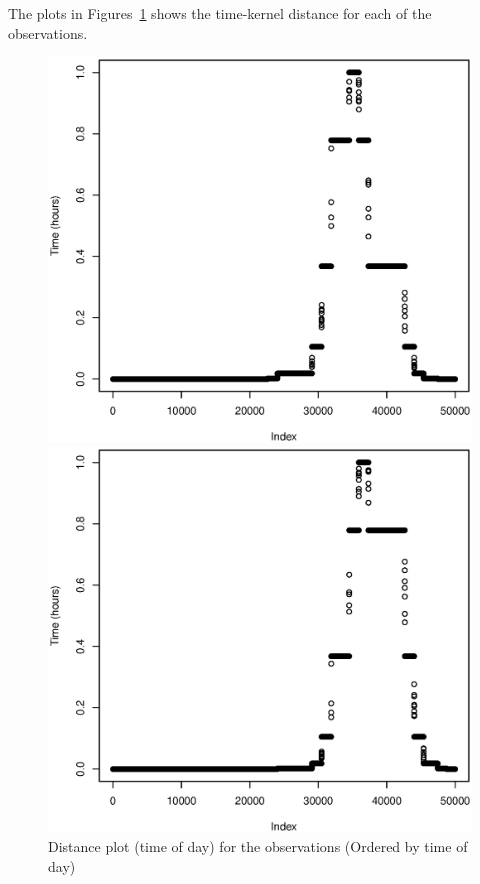 \documentclass[a4paper, twocolumn]{article}
\begin{document}
    The plots in Figures~\ref{fig:time} shows the time-kernel distance for each of the observations.  
    \begin{figure}[!ht]
    \centering
    \caption{Distance plot (time of day) for the observations (Ordered by time of day) \label{fig:time}}
	    \begin{minipage}[]{0.2\textwidth}
	    	\includegraphics[width=\textwidth]{share/1_time.eps}
	    \end{minipage}
	    \begin{minipage}[]{0.2\textwidth}
	    	\includegraphics[width=\textwidth]{share/2_time.eps}

\end{minipage}
\end{figure}
\end{document}
